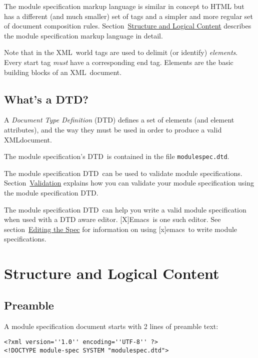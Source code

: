 \documentclass{article}
\newcommand{\acronym}[1]{#1}
\newcommand{\dfn}[1]{\emph{#1}}
\newcommand{\filename}[1]{\texttt{#1}}
\newcommand{\xml}{\acronym{XML}}
\newcommand{\dtd}{\acronym{DTD}}
\newcommand{\emacs}{[x]emacs}
\newcommand{\Emacs}{[X]Emacs}
\newcommand{\sectitleref}[1]{\emph{#1}}
\newcommand{\SUBSECwhatDtd}{What's a \dtd?}
\newcommand{\SECcontent}{Structure and Logical Content}
\newcommand{\SUBSECpreamble}{Preamble}
\newcommand{\SECediting}{Editing the Spec}
\newcommand{\SUBSECvalidation}{Validation}
\begin{document}
The module specification markup language is similar in concept to HTML but
has a different (and much smaller) set of tags and a simpler and more
regular set of document composition rules.
Section~\hyperref{\sectitleref{\SECcontent}}{}{}{\SECcontent} describes
the module specification markup language in detail.

Note that in the \xml\ world tags are used to delimit (or identify)
\dfn{elements}.  Every start tag \emph{must} have a corresponding end tag.
Elements are the basic building blocks of an \xml\ document.

\subsection{\SUBSECwhatDtd}
\label{\SUBSECwhatDtd}

A \dfn{Document Type Definition} (\dtd) defines a set of elements (and
element attributes), and the way they must be used in order to produce a
valid \xml document.

The module specification's \dtd\ is contained in the file
\filename{modulespec.dtd}. 

The module specification \dtd\ can be used to validate module
specifications.
Section~\hyperref{\sectitleref{\SUBSECvalidation}}{}{}{\SUBSECvalidation}
explains how you can validate your module specification using the module
specification \dtd.

The module specification \dtd\ can help you write a valid module
specification when used with a \acronym{DTD} aware editor.  \Emacs\ is one
such editor.  See
section~\hyperref{\sectitleref{\SECediting}}{}{}{\SECediting} for information
on using \emacs\ to write module specifications.

\section{\SECcontent}
\label{\SECcontent}


\subsection{\SUBSECpreamble}
\label{\SUBSECpreamble}

A module specification document starts with 2 lines of preamble text:

\begin{verbatim}
<?xml version=''1.0'' encoding=''UTF-8'' ?>
<!DOCTYPE module-spec SYSTEM "modulespec.dtd">
\end{verbatim}
\end{document}
